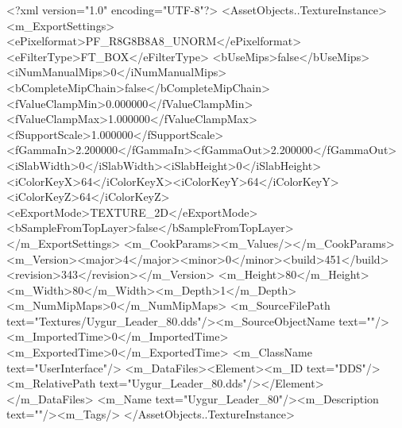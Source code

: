 <?xml version="1.0" encoding="UTF-8"?>
<AssetObjects..TextureInstance>
  <m_ExportSettings>
    <ePixelformat>PF_R8G8B8A8_UNORM</ePixelformat><eFilterType>FT_BOX</eFilterType>
    <bUseMips>false</bUseMips><iNumManualMips>0</iNumManualMips><bCompleteMipChain>false</bCompleteMipChain>
    <fValueClampMin>0.000000</fValueClampMin><fValueClampMax>1.000000</fValueClampMax><fSupportScale>1.000000</fSupportScale>
    <fGammaIn>2.200000</fGammaIn><fGammaOut>2.200000</fGammaOut><iSlabWidth>0</iSlabWidth><iSlabHeight>0</iSlabHeight>
    <iColorKeyX>64</iColorKeyX><iColorKeyY>64</iColorKeyY><iColorKeyZ>64</iColorKeyZ>
    <eExportMode>TEXTURE_2D</eExportMode><bSampleFromTopLayer>false</bSampleFromTopLayer>
  </m_ExportSettings>
  <m_CookParams><m_Values/></m_CookParams>
  <m_Version><major>4</major><minor>0</minor><build>451</build><revision>343</revision></m_Version>
  <m_Height>80</m_Height><m_Width>80</m_Width><m_Depth>1</m_Depth><m_NumMipMaps>0</m_NumMipMaps>
  <m_SourceFilePath text="Textures/Uygur_Leader_80.dds"/><m_SourceObjectName text=""/>
  <m_ImportedTime>0</m_ImportedTime><m_ExportedTime>0</m_ExportedTime>
  <m_ClassName text="UserInterface"/>
  <m_DataFiles><Element><m_ID text="DDS"/><m_RelativePath text="Uygur_Leader_80.dds"/></Element></m_DataFiles>
  <m_Name text="Uygur_Leader_80"/><m_Description text=""/><m_Tags/>
</AssetObjects..TextureInstance>

